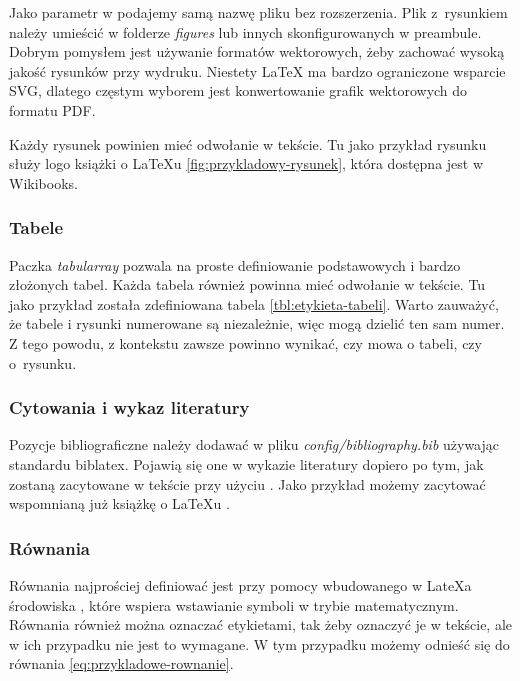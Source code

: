 Jako parametr w  podajemy samą
nazwę pliku bez rozszerzenia. Plik z~rysunkiem należy umieścić
w folderze \emph{figures} lub innych skonfigurowanych w preambule.
Dobrym pomysłem jest używanie formatów wektorowych, żeby zachować wysoką
jakość rysunków przy wydruku. Niestety LaTeX ma bardzo ograniczone
wsparcie SVG, dlatego częstym wyborem jest konwertowanie grafik
wektorowych do formatu PDF.

Każdy rysunek powinien mieć odwołanie w tekście. Tu jako przykład
rysunku służy logo książki o LaTeXu \ref{fig:przykladowy-rysunek}, która
dostępna jest w Wikibooks.

\subsubsection{Tabele}



Paczka \emph{tabularray} pozwala na proste definiowanie podstawowych
i bardzo złożonych tabel. Każda tabela również powinna mieć odwołanie
w tekście. Tu jako przykład została zdefiniowana tabela
\ref{tbl:etykieta-tabeli}. Warto zauważyć, że tabele i rysunki
numerowane są niezależnie, więc mogą dzielić ten sam numer. Z tego
powodu, z kontekstu zawsze powinno wynikać, czy mowa o tabeli, czy
o~rysunku.

\subsubsection{Cytowania i wykaz literatury}

Pozycje bibliograficzne należy dodawać w pliku
\emph{config/bibliography.bib} używając standardu biblatex. Pojawią się
one w wykazie literatury dopiero po tym, jak zostaną zacytowane w tekście
przy użyciu . Jako przykład możemy zacytować
wspomnianą już książkę o LaTeXu \cite{book:latex}.

\subsubsection{Równania}

Równania najprościej definiować jest przy pomocy wbudowanego w LateXa
środowiska , które wspiera wstawianie
symboli w trybie matematycznym. Równania również można oznaczać
etykietami, tak żeby oznaczyć je w tekście, ale w ich przypadku nie jest
to wymagane. W tym przypadku możemy odnieść się do równania
\ref{eq:przykladowe-rownanie}.

